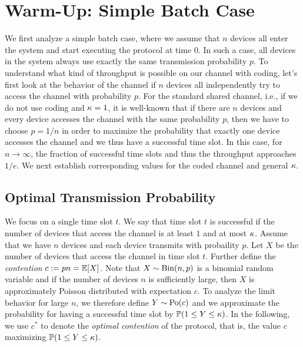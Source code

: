 \section{Warm-Up: Simple Batch Case}
\label{sec:batch}

We first analyze a simple batch case, where we assume that $n$ devices
all enter the system and start executing the protocol at time $0$. In
such a case, all devices in the system always use exactly the same
transmission probability $p$. To understand what kind of throughput is
possible on our channel with coding, let's first look at the behavior
of the channel if $n$ devices all independently try to access the
channel with probability $p$.  For the standard shared channel, i.e.,
if we do not use coding and $\kappa=1$, it is well-known that if
there are $n$ devices and every device accesses the channel with the
same probability $p$, then we have to choose $p=1/n$ in order to
maximize the probability that exactly one device accesses the channel
and we thus have a successful time slot. In this case, for
$n\to\infty$, the fraction of successful time slots and thus the
throughput approaches $1/e$. We next establish corresponding values
for the coded channel and general $\kappa$.

\subsection{Optimal Transmission Probability}

We focus on a single time slot $t$. We say that time slot $t$ is
successful if the number of devices that access the channel is at
least $1$ and at most $\kappa$. Assume that we have $n$ devices
and each device transmits with probaility $p$. Let $X$ be the number
of devices that access the channel in time slot $t$. Further define the
\emph{contention} $c:=pn=\operatorname{\mathbb{E}}[X]$. Note that $X\sim\mathrm{Bin}(n,p)$ is a
binomial random variable and if the number of devices $n$ is
sufficiently large, then $X$ is approximately Poisson distributed with
expectation $c$. To analyze the limit behavior for large $n$, we
therefore define $Y\sim \mathrm{Po}(c)$ and we approximate the probability for
having a successful time slot by $\mathbb{P}(1\leq Y\leq \kappa)$. In the
following, we use $c^*$ to denote the \emph{optimal contention} of the
protocol, that is, the value $c$ maximizing $\mathbb{P}(1\leq Y\leq \kappa)$.

